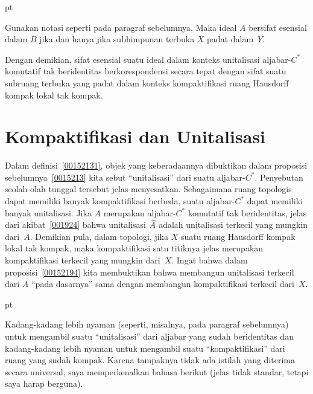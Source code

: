  pt

\begin{prop}\label{0038474} Gunakan notasi seperti pada paragraf sebelumnya. Maka
ideal $A$ bersifat esensial dalam $B$ jika dan hanya jika subhimpunan terbuka $X$ padat dalam~$Y$.
\end{prop}

Dengan demikian, sifat esensial suatu ideal dalam konteks unitalisasi aljabar-$C^*$
komutatif tak beridentitas berkorespondensi secara tepat dengan sifat suatu subruang terbuka
yang padat dalam konteks kompaktifikasi ruang Hausdorff kompak lokal
tak kompak.





















\section{Kompaktifikasi dan Unitalisasi}
Dalam definisi~\ref{00152131}, objek yang keberadaannya dibuktikan dalam
proposisi sebelumnya~\ref{0015213} kita sebut ``unitalisasi'' dari suatu aljabar-$C^*$. Penyebutan seolah-olah tunggal
tersebut jelas menyesatkan. Sebagaimana ruang topologis dapat memiliki banyak
kompaktifikasi berbeda, suatu aljabar-$C^*$ dapat memiliki banyak unitalisasi. Jika $A$ merupakan
aljabar-$C^*$ komutatif tak beridentitas, jelas dari akibat~\ref{001924} bahwa
unitalisasi $\widetilde{A}$ adalah unitalisasi terkecil yang mungkin dari~$A$. Demikian pula, dalam topologi,
jika $X$ suatu ruang Hausdorff kompak lokal tak kompak, maka kompaktifikasi
satu titiknya jelas merupakan kompaktifikasi terkecil yang mungkin dari~$X$. Ingat bahwa
dalam proposisi~\ref{00152194} kita membuktikan bahwa membangun unitalisasi terkecil
dari $A$ ``pada dasarnya'' sama dengan membangun kompaktifikasi terkecil
dari~$X$.

  pt

Kadang-kadang lebih nyaman (seperti, misalnya, pada paragraf sebelumnya) untuk mengambil suatu
``unitalisasi'' dari aljabar yang sudah beridentitas dan kadang-kadang lebih nyaman untuk mengambil suatu
``kompaktifikasi'' dari ruang yang sudah kompak. Karena tampaknya tidak ada
istilah yang diterima secara universal, saya memperkenalkan bahasa berikut (jelas tidak standar, tetapi
saya harap berguna).


